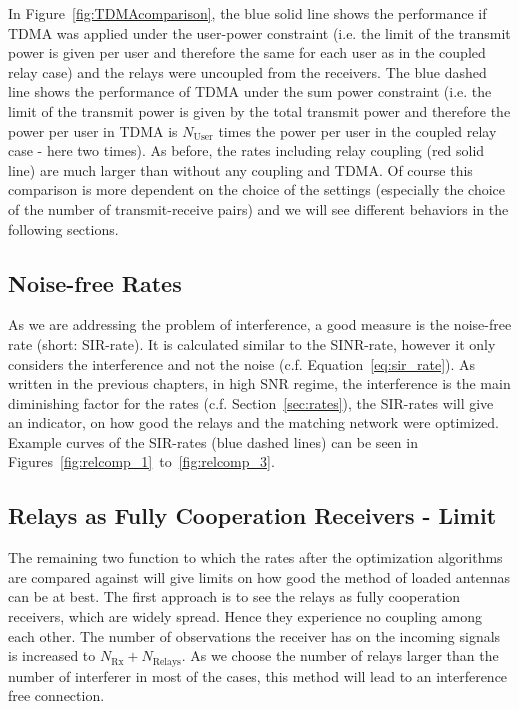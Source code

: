 In Figure~\ref{fig:TDMAcomparison}, the blue solid line shows the performance if TDMA was applied under the user-power constraint (i.e. the limit of the transmit power is given per user and therefore the same for each user as in the coupled relay case) and the relays were uncoupled from the receivers.
The blue dashed line shows the performance of TDMA under the sum power constraint (i.e. the limit of the transmit power is given by the total transmit power and therefore the power per user in TDMA is $N_\text{User}$ times the power per user in the coupled relay case - here two times).
As before, the rates including relay coupling (red solid line) are much larger than without any coupling and TDMA.
Of course this comparison is more dependent on the choice of the settings (especially the choice of the number of transmit-receive pairs) and we will see different behaviors in the following sections. 

\subsection{Noise-free Rates}
\label{sec:sir}
As we are addressing the problem of interference, a good measure is the noise-free rate (short: SIR-rate).
It is calculated similar to the SINR-rate, however it only considers the interference and not the noise (c.f. Equation~\eqref{eq:sir_rate}).
As written in the previous chapters, in high SNR regime, the interference is the main diminishing factor for the rates (c.f. Section~\ref{sec:rates}), the SIR-rates will give an indicator, on how good the relays and the matching network were optimized.
Example curves of the SIR-rates (blue dashed lines) can be seen in Figures~\ref{fig:relcomp_1}~to~\ref{fig:relcomp_3}.

\subsection{Relays as Fully Cooperation Receivers - Limit}
\label{sec:fullrx_limit}
The remaining two function to which the rates after the optimization algorithms are compared against will give limits on how good the method of loaded antennas can be at best.
The first approach is to see the relays as fully cooperation receivers, which are widely spread.
Hence they experience no coupling among each other.
The number of observations the receiver has on the incoming signals is increased to $N_\text{Rx} + N_\text{Relays}$.
As we choose the number of relays larger than the number of interferer in most of the cases, this method will lead to an interference free connection.

